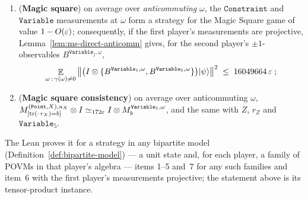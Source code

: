 \begin{lemma}
\begin{enumerate}
  $M^{(\mathtt{Point}, W), u_W}_{[\fieldtr(\cdot\, r_W) = b]} \ot \Id \simeq_{172\eps}
    \Id \ot M^{(\mathtt{Pair}, W), \omega}_b$;
\item (\textbf{Magic square}) on average over \emph{anticommuting} $\omega$, the
  $\mathtt{Constraint}$ and $\mathtt{Variable}$ measurements at $\omega$ form a strategy for the
  Magic Square game of value $1 - O(\varepsilon)$; consequently, if the first player's measurements are
  projective, Lemma~\ref{lem:ms-direct-anticomm} gives, for the second player's
  $\pm 1$-observables $B^{\mathtt{Variable}_j, \omega}$,
  \begin{equation*}
    \mathop{\mathbb{E}}_{\omega \,:\, \gamma(\omega) \neq 0}
      \left\| {\bigl(I \otimes \{B^{\mathtt{Variable}_1, \omega},
        B^{\mathtt{Variable}_5, \omega}\}\bigr) |\psi\rangle} \right\|^2 \;\leq\; 16049664\,\varepsilon\;;
  \end{equation*}
\item (\textbf{Magic square consistency}) on average over anticommuting $\omega$,
  $M^{(\mathtt{Point}, X), u_X}_{[\operatorname{tr}(\cdot\, r_X) = b]} \otimes I \simeq_{172\varepsilon}
    I \otimes M^{\mathtt{Variable}_1, \omega}_b$, and the same with $Z$, $r_Z$ and
  $\mathtt{Variable}_5$.
\end{enumerate}
The Lean proves it for a strategy in any bipartite model (Definition~\ref{def:bipartite-model})
--- a unit state and, for each player, a family of POVMs in that player's algebra --- items 1--5
and~7 for any such families and item~6 with the first player's measurements projective; the
statement above is its tensor-product instance.
\end{lemma}


